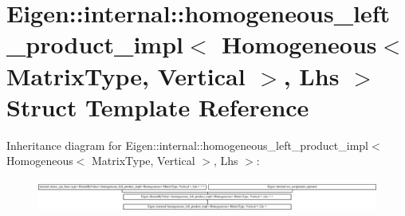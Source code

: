 \hypertarget{struct_eigen_1_1internal_1_1homogeneous__left__product__impl_3_01_homogeneous_3_01_matrix_type_042480d8c61b8193bc4c7039abeeef67a}{}\section{Eigen\+::internal\+::homogeneous\+\_\+left\+\_\+product\+\_\+impl$<$ Homogeneous$<$ Matrix\+Type, Vertical $>$, Lhs $>$ Struct Template Reference}
\label{struct_eigen_1_1internal_1_1homogeneous__left__product__impl_3_01_homogeneous_3_01_matrix_type_042480d8c61b8193bc4c7039abeeef67a}
Inheritance diagram for Eigen\+::internal\+::homogeneous\+\_\+left\+\_\+product\+\_\+impl$<$ Homogeneous$<$ Matrix\+Type, Vertical $>$, Lhs $>$\+:\begin{figure}[H]
\begin{center}
\leavevmode
\includegraphics[height=1.079692cm]{struct_eigen_1_1internal_1_1homogeneous__left__product__impl_3_01_homogeneous_3_01_matrix_type_042480d8c61b8193bc4c7039abeeef67a}
\end{center}
\end{figure}

